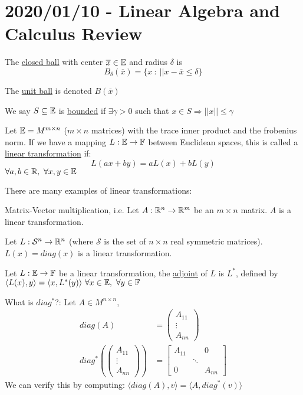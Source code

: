 \section{2020/01/10 - Linear Algebra and Calculus Review}

\begin{definition}
    The \underline{closed ball} with center $\overline{x} \in \mathbb{E}$ and radius $\delta$ is
    \begin{equation*}
        B_\delta(\overline{x}) = \{x\::\:||x - \overline{x} \leq \delta \}
    \end{equation*}
\end{definition}
The \underline{unit ball} is denoted $B(\overline{x})$

We say $S \subseteq \mathbb{E}$ is \underline{bounded} if $\exists \gamma > 0$ such that $x \in S \Rightarrow ||x|| \leq \gamma$

Let $\mathbb{E} = M^{m \times n}$ ($m \times n$ matrices) with the trace inner product and the frobenius norm.
If we have a mapping $L: \mathbb{E} \rightarrow \mathbb{F}$ between Euclidean spaces, this is called a \underline{linear transformation} if:
\begin{equation*}
    L(ax + by) = aL(x) + bL(y)
\end{equation*}
$\forall a, b \in \mathbb{R}, \ \forall x, y \in \mathbb{E}$

There are many examples of linear transformations:
\begin{example}
    Matrix-Vector multiplication, i.e. Let $A: \mathbb{R}^n \rightarrow \mathbb{R}^m$ be an $m \times n$ matrix. $A$ is a linear transformation.
\end{example}

\begin{example}
    Let $L: \mathcal{S}^n \rightarrow \mathbb{R}^n$ (where $\mathcal{S}$ is the set of $n \times n$ real symmetric matrices). 
    $L(x) = diag(x)$ is a linear transformation.
\end{example}

Let $L: \mathbb{E} \rightarrow \mathbb{F}$ be a linear transformation, the \underline{adjoint} of $L$ is $L^*$, defined by $\langle L(x), y \rangle = \langle x, L^*(y) \rangle \ \forall x \in \mathbb{E}, \ \forall y \in \mathbb{F}$

What is $diag^*$?: Let $A \in M^{n \times n}$,
\begin{align*}
    diag(A) &= \begin{pmatrix}
        A_{11} \\ \vdots \\ A_{nn}      
    \end{pmatrix} \\
    diag^*\left(\begin{pmatrix}
        A_{11} \\ \vdots \\ A_{nn}
    \end{pmatrix}\right) &= \begin{bmatrix}
        A_{11} & & 0 \\
        & \ddots & \\ 
        0 & & A_{nn}
    \end{bmatrix}
\end{align*}
We can verify this by computing: $\langle diag(A), v \rangle = \langle A, diag^*(v) \rangle$

